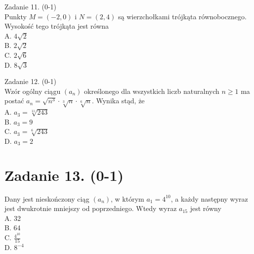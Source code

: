 \documentclass[10pt]{article}
\begin{document}
Zadanie 11. (0-1)\\
Punkty \(M=(-2,0)\) i \(N=(2,4)\) są wierzchołkami trójkąta równobocznego. Wysokość tego trójkąta jest równa\\
A. \(4 \sqrt{2}\)\\
B. \(2 \sqrt{2}\)\\
C. \(2 \sqrt{6}\)\\
D. \(8 \sqrt{3}\)

Zadanie 12. (0-1)\\
Wzór ogólny ciągu \(\left(a_{n}\right)\) określonego dla wszystkich liczb naturalnych \(n \geqslant 1\) ma postać \(a_{n}=\sqrt{n^{3}} \cdot \sqrt[3]{n} \cdot \sqrt[6]{n}\). Wynika stąd, że\\
A. \(a_{3}=\sqrt[11]{243}\)\\
B. \(a_{3}=9\)\\
C. \(a_{3}=\sqrt[6]{243}\)\\
D. \(a_{3}=2\)

\section*{Zadanie 13. (0-1)}
Dany jest nieskończony ciąg \(\left(a_{n}\right)\), w którym \(a_{1}=4^{10}\), a każdy następny wyraz jest dwukrotnie mniejszy od poprzedniego. Wtedy wyraz \(a_{15}\) jest równy\\
A. 32\\
B. 64\\
C. \(\frac{4^{10}}{15}\)\\
D. \(8^{-4}\)
\end{document}
